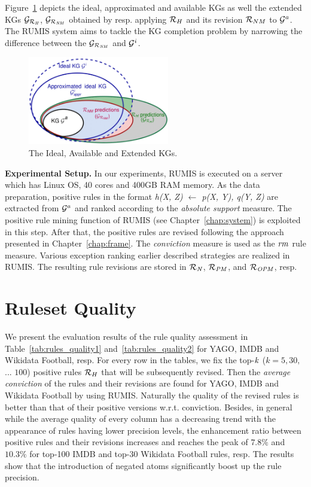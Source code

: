 Figure~\ref{fig:venn} depicts the ideal, approximated and available KGs as well the extended KGs $\mathcal{G}_{\mathcal{R}_{\mathit{H}}}$, $\mathcal{G}_{\mathcal{R}_{\mathit{NM}}}$ obtained by resp. applying $\mathcal{R}_H$ and its revision $\mathcal{R}_{NM}$ to $\mathcal{G}^a$. The RUMIS system aims to tackle the KG completion problem by narrowing the difference between the $\mathcal{G}_{\mathcal{R}_{\mathit{NM}}}$ and $ \mathcal{G}^i$.

\begin{figure}[ht]
\centering
\includegraphics[width=0.55\textwidth]{figures/big_pic_exp}
\caption{The Ideal, Available and Extended KGs.}
\label{fig:venn}
\end{figure}

\textbf{Experimental Setup.} In our experiments, RUMIS is executed on a server which has Linux OS, 40 cores and 400GB RAM memory. As the data preparation, positive rules in the format \textit{h(X, Z) $\leftarrow$ p(X, Y), q(Y, Z)} are extracted from $\mathcal{G}^a$ and ranked according to the \textit{absolute support} measure. The positive rule mining function of RUMIS (see Chapter~\ref{chap:system}) is exploited in this step. After that, the positive rules are revised following the approach presented in Chapter~\ref{chap:frame}. The \textit{conviction} measure is used as the $\mathit{rm}$ rule measure. Various exception ranking earlier described strategies are realized in RUMIS. The resulting rule revisions are stored in $\mathit{\mathcal{R}_{N}}$, $\mathit{\mathcal{R}_{PM}}$, and $\mathit{\mathcal{R}_{OPM}}$, resp.

\section{Ruleset Quality}

We present the evaluation results of the rule quality assessment in Table~\ref{tab:rules_quality1} and~\ref{tab:rules_quality2} for YAGO, IMDB and Wikidata Football, resp. For every row in the tables, we fix the top-$\mathit{k}$ ($k=5,30,$ ... $100$) positive rules $\mathcal{R}_{H}$ that will be subsequently revised. Then the \textit{average conviction} of the rules and their revisions are found for YAGO, IMDB and Wikidata Football by using RUMIS. Naturally the quality of the revised rules is better than that of their positive versions w.r.t. conviction. Besides, in general while the average quality of every column has a decreasing trend with the appearance of rules having lower precision levels, the enhancement ratio between positive rules and their revisions increases and reaches the peak of $7.8\%$ and $10.3\%$ for top-100 IMDB and top-30 Wikidata Football rules, resp. The results show that the introduction of negated atoms significantly boost up the rule precision.

